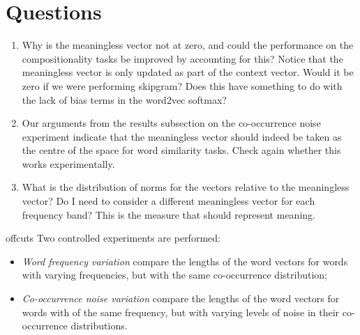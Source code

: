 \documentclass{article} %
\begin{document}
\section{Questions}
\begin{enumerate}
\item{ Why is the meaningless vector not at zero, and could the performance on the compositionality tasks be improved by accounting for this?  Notice that the meaningless vector is only updated as part of the context vector.  Would it be zero if we were performing skipgram? Does this have something to do with the lack of bias terms in the word2vec softmax?}
\item{Our arguments from the results subsection on the co-occurrence noise experiment indicate that the meaningless vector should indeed be taken as the centre of the space for word similarity tasks.  Check again whether this works experimentally.}
\item{What is the distribution of norms for the vectors relative to the meaningless vector?  Do I need to consider a different meaningless vector for each frequency band?  This is the measure that should represent meaning.}

\end{enumerate}


\begin{section}{offcuts}
Two controlled experiments are performed:
\begin{itemize}
	\item \emph{Word frequency variation} compare the lengths of the word vectors for words with varying frequencies, but with the same co-occurrence distribution;
	\item \emph{Co-occurrence noise variation} compare the lengths of the word vectors for words with of the same frequency, but with varying levels of noise in their co-occurrence distributions.
\end{itemize}
\end{section}

\footnotesize


\end{document}
